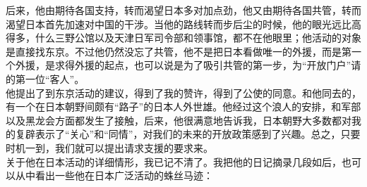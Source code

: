 后来，他由期待各国支持，转而渴望日本多对加点劲，他又由期待各国共管，转而渴望日本首先加速对中国的干涉。当他的路线转而步后尘的时候，他的眼光远比高得多，什么三野公馆以及天津日军司令部和领事馆，都不在他眼里；他活动的对象是直接找东京。不过他仍然没忘了共管，他不是把日本看做唯一的外援，而是第一个外援，是求得外援的起点，也可以说是为了吸引共管的第一步，为“开放门户”请的第一位“客人”。\\

他提出了到东京活动的建议，得到了我的赞许，得到了公使的同意。和他同去的，有一个在日本朝野间颇有“路子”的日本人外世雄。他经过这个浪人的安排，和军部以及黑龙会方面都发生了接触，后来，他很满意地告诉我，日本朝野大多数都对我的复辟表示了“关心”和“同情”，对我们的未来的开放政策感到了兴趣。总之，只要时机一到，我们就可以提出请求支援的要求来。\\

关于他在日本活动的详细情形，我已记不清了。我把他的日记摘录几段如后，也可以从中看出一些他在日本广泛活动的蛛丝马迹：\\

